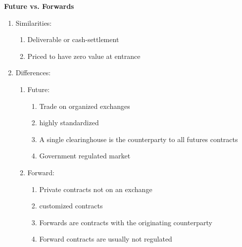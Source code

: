 \documentclass[11pt,fleqn]{report} %
\numberwithin{equation}{section} %
\numberwithin{figure}{section} %
\numberwithin{table}{section} %
\begin{document}
\begin{definition}\textbf{Future vs. Forwards}
\begin{enumerate}
    \item Similarities:
    \begin{enumerate}
        \item Deliverable or cash-settlement
        \item Priced to have zero value at entrance
    \end{enumerate}
    \item Differences:
    \begin{enumerate}
        \item Future:
        \begin{enumerate}
            \item Trade on organized exchanges
            \item highly standardized
            \item A single clearinghouse is the counterparty to all futures contracts
            \item Government regulated market
        \end{enumerate}
        \item Forward:
        \begin{enumerate}
            \item Private contracts not on an exchange
            \item customized contracts
            \item Forwards are contracts with the originating counterparty
            \item Forward contracts are usually not regulated
        \end{enumerate}
    \end{enumerate}
\end{enumerate}
\end{definition}
\end{document}
